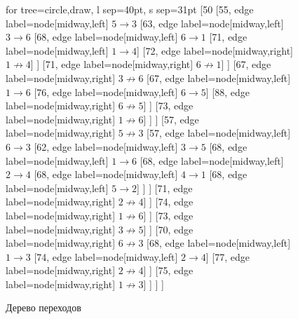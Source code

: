 \begin{figure}[H]
\begin{center}
	\begin{forest}
	for tree={circle,draw, l sep=40pt, s sep=31pt}
	[50 
		[55, edge label={node[midway,left] {$5 \rightarrow 3$}}  
			[63, edge label={node[midway,left] {$3 \rightarrow 6$}} 
				[68, edge label={node[midway,left] {$6 \rightarrow 1$}}
					[71, edge label={node[midway,left] {$1 \rightarrow 4$}}]
					[72, edge label={node[midway,right] {$1 \not\rightarrow 4$}}]
				]
				[71, edge label={node[midway,right] {$6 \not\rightarrow 1$}}]
			] 
			[67, edge label={node[midway,right] {$3 \not\rightarrow 6$}}
				[67, edge label={node[midway,left] {$1 \rightarrow 6$}}
					[76, edge label={node[midway,left] {$6 \rightarrow 5$}}]
					[88, edge label={node[midway,right] {$6 \not\rightarrow 5$}}]
				]
				[73, edge label={node[midway,right] {$1 \not\rightarrow 6$}}]
			] 
		]
		[57, edge label={node[midway,right] {$5 \not\rightarrow 3$}}
			[57, edge label={node[midway,left] {$6 \rightarrow 3$}}
				[62, edge label={node[midway,left] {$3 \rightarrow 5$}}
					[68, edge label={node[midway,left] {$1 \rightarrow 6$}}
						[68, edge label={node[midway,left] {$2 \rightarrow 4$}}
								[68, edge label={node[midway,left] {$4 \rightarrow 1$}}
									[68, edge label={node[midway,left] {$5 \rightarrow 2$}}]								
								]
						]
						[71, edge label={node[midway,right] {$2 \not\rightarrow 4$}}]
					]
					[74, edge label={node[midway,right] {$1 \not\rightarrow 6$}}]
				]
				[73, edge label={node[midway,right] {$3 \not\rightarrow 5$}}]
			]
			[70, edge label={node[midway,right] {$6 \not\rightarrow 3$}}
				[68, edge label={node[midway,left] {$1 \rightarrow 3$}}
					[74, edge label={node[midway,left] {$2 \rightarrow 4$}}]
					[77, edge label={node[midway,right] {$2 \not\rightarrow 4$}}]
				]
				[75, edge label={node[midway,right] {$1 \not\rightarrow 3$}}]
			]
		]
	]
	\end{forest}
	\caption{Дерево переходов}
	\label{pic:graph}
\end{center}
\end{figure}


